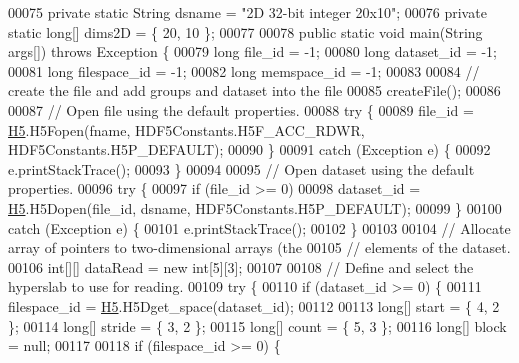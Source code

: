 \begin{DoxyCode}
00075     \textcolor{keyword}{private} \textcolor{keyword}{static} String dsname  = \textcolor{stringliteral}{"2D 32-bit integer 20x10"};
00076     \textcolor{keyword}{private} \textcolor{keyword}{static} \textcolor{keywordtype}{long}[] dims2D = \{ 20, 10 \};
00077 
00078     \textcolor{keyword}{public} \textcolor{keyword}{static} \textcolor{keywordtype}{void} main(String args[]) \textcolor{keywordflow}{throws} Exception \{
00079         \textcolor{keywordtype}{long} file\_id = -1;
00080         \textcolor{keywordtype}{long} dataset\_id = -1;
00081         \textcolor{keywordtype}{long} filespace\_id = -1;
00082         \textcolor{keywordtype}{long} memspace\_id = -1;
00083 
00084         \textcolor{comment}{// create the file and add groups and dataset into the file}
00085         createFile();
00086 
00087         \textcolor{comment}{// Open file using the default properties.}
00088         \textcolor{keywordflow}{try} \{
00089             file\_id = \hyperlink{namespace_h5}{H5}.H5Fopen(fname, HDF5Constants.H5F\_ACC\_RDWR, HDF5Constants.H5P\_DEFAULT);
00090         \}
00091         \textcolor{keywordflow}{catch} (Exception e) \{
00092             e.printStackTrace();
00093         \}
00094 
00095         \textcolor{comment}{// Open dataset using the default properties.}
00096         \textcolor{keywordflow}{try} \{
00097             \textcolor{keywordflow}{if} (file\_id >= 0)
00098                 dataset\_id = \hyperlink{namespace_h5}{H5}.H5Dopen(file\_id, dsname, HDF5Constants.H5P\_DEFAULT);
00099         \}
00100         \textcolor{keywordflow}{catch} (Exception e) \{
00101             e.printStackTrace();
00102         \}
00103 
00104         \textcolor{comment}{// Allocate array of pointers to two-dimensional arrays (the}
00105         \textcolor{comment}{// elements of the dataset.}
00106         \textcolor{keywordtype}{int}[][] dataRead = \textcolor{keyword}{new} \textcolor{keywordtype}{int}[5][3];
00107 
00108         \textcolor{comment}{// Define and select the hyperslab to use for reading.}
00109         \textcolor{keywordflow}{try} \{
00110             \textcolor{keywordflow}{if} (dataset\_id >= 0) \{
00111                 filespace\_id = \hyperlink{namespace_h5}{H5}.H5Dget\_space(dataset\_id);
00112 
00113                 \textcolor{keywordtype}{long}[] start = \{ 4, 2 \};
00114                 \textcolor{keywordtype}{long}[] stride = \{ 3, 2 \};
00115                 \textcolor{keywordtype}{long}[] count = \{ 5, 3 \};
00116                 \textcolor{keywordtype}{long}[] block = null;
00117 
00118                 \textcolor{keywordflow}{if} (filespace\_id >= 0) \{

\end{DoxyCode}
